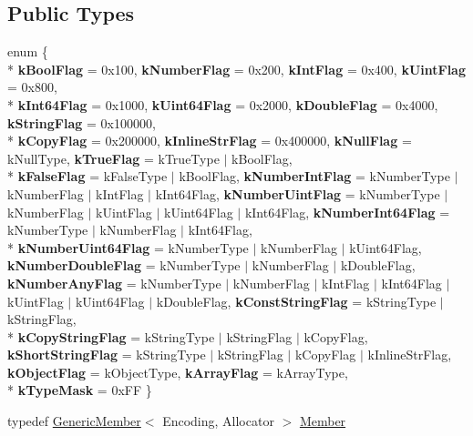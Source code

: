 \subsection*{Public Types}
\begin{DoxyCompactItemize}
\item 
enum \{ \\*
{\bfseries k\+Bool\+Flag} = 0x100, 
{\bfseries k\+Number\+Flag} = 0x200, 
{\bfseries k\+Int\+Flag} = 0x400, 
{\bfseries k\+Uint\+Flag} = 0x800, 
\\*
{\bfseries k\+Int64\+Flag} = 0x1000, 
{\bfseries k\+Uint64\+Flag} = 0x2000, 
{\bfseries k\+Double\+Flag} = 0x4000, 
{\bfseries k\+String\+Flag} = 0x100000, 
\\*
{\bfseries k\+Copy\+Flag} = 0x200000, 
{\bfseries k\+Inline\+Str\+Flag} = 0x400000, 
{\bfseries k\+Null\+Flag} = k\+Null\+Type, 
{\bfseries k\+True\+Flag} = k\+True\+Type $\vert$ k\+Bool\+Flag, 
\\*
{\bfseries k\+False\+Flag} = k\+False\+Type $\vert$ k\+Bool\+Flag, 
{\bfseries k\+Number\+Int\+Flag} = k\+Number\+Type $\vert$ k\+Number\+Flag $\vert$ k\+Int\+Flag $\vert$ k\+Int64\+Flag, 
{\bfseries k\+Number\+Uint\+Flag} = k\+Number\+Type $\vert$ k\+Number\+Flag $\vert$ k\+Uint\+Flag $\vert$ k\+Uint64\+Flag $\vert$ k\+Int64\+Flag, 
{\bfseries k\+Number\+Int64\+Flag} = k\+Number\+Type $\vert$ k\+Number\+Flag $\vert$ k\+Int64\+Flag, 
\\*
{\bfseries k\+Number\+Uint64\+Flag} = k\+Number\+Type $\vert$ k\+Number\+Flag $\vert$ k\+Uint64\+Flag, 
{\bfseries k\+Number\+Double\+Flag} = k\+Number\+Type $\vert$ k\+Number\+Flag $\vert$ k\+Double\+Flag, 
{\bfseries k\+Number\+Any\+Flag} = k\+Number\+Type $\vert$ k\+Number\+Flag $\vert$ k\+Int\+Flag $\vert$ k\+Int64\+Flag $\vert$ k\+Uint\+Flag $\vert$ k\+Uint64\+Flag $\vert$ k\+Double\+Flag, 
{\bfseries k\+Const\+String\+Flag} = k\+String\+Type $\vert$ k\+String\+Flag, 
\\*
{\bfseries k\+Copy\+String\+Flag} = k\+String\+Type $\vert$ k\+String\+Flag $\vert$ k\+Copy\+Flag, 
{\bfseries k\+Short\+String\+Flag} = k\+String\+Type $\vert$ k\+String\+Flag $\vert$ k\+Copy\+Flag $\vert$ k\+Inline\+Str\+Flag, 
{\bfseries k\+Object\+Flag} = k\+Object\+Type, 
{\bfseries k\+Array\+Flag} = k\+Array\+Type, 
\\*
{\bfseries k\+Type\+Mask} = 0x\+FF
 \}\hypertarget{class_generic_value_a2b7ad6fedbaf5e1c9c2099d644dfc044}{}\label{class_generic_value_a2b7ad6fedbaf5e1c9c2099d644dfc044}

\item 
typedef \hyperlink{struct_generic_member}{Generic\+Member}$<$ Encoding, Allocator $>$ \hyperlink{class_generic_value_a7ccf27c44058b4c11c3efc6473afb886}{Member}\hypertarget{class_generic_value_a7ccf27c44058b4c11c3efc6473afb886}{}\label{class_generic_value_a7ccf27c44058b4c11c3efc6473afb886}


\end{DoxyCompactItemize}
